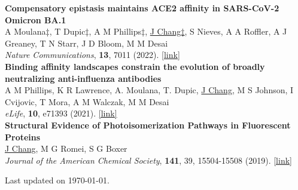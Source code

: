 \documentclass[margin,11pt]{res}
\begin{document}
\begin{resume}
\begin{changemargin}{-8.5em}{0em}
    \textbf{Compensatory epistasis maintains ACE2 affinity in SARS-CoV-2 Omicron BA.1}
    \\
    A Moulana‡, T Dupic‡, A M Phillips‡, \underline{J Chang‡}, S Nieves, A A Roffler, A J Greaney, T N Starr, J D Bloom, M M Desai
    \\
    \textit{Nature Communications},
    \textbf{13},
    7011
    (2022).
    \href{https://doi.org/10.1038/s41467-022-34506-z}{[link]}
    \\

    \textbf{Binding affinity landscapes constrain the evolution of broadly neutralizing anti-influenza antibodies}
    \\
    A M Phillips, K R Lawrence, A. Moulana, T. Dupic, \underline{J Chang}, M S Johnson, I Cvijovic, T Mora, A M Walczak, M M Desai
    \\
    \textit{eLife},
    \textbf{10},
    e71393
    (2021).
    \href{https://doi.org/10.7554/eLife.71393}{[link]}
    \\

    \textbf{Structural Evidence of Photoisomerization Pathways in Fluorescent Proteins}
    \\
    \underline{J Chang}, M G Romei, S G Boxer
    \\
    \textit{Journal of the American Chemical Society},
    \textbf{141}, 39,
    15504-15508
    (2019).
    \href{http://dx.doi.org/10.1021/jacs.9b08356}{[link]}
\end{changemargin}

\end{resume}

\vfill\hfill{\scriptsize Last updated on \today.}
\end{document}
